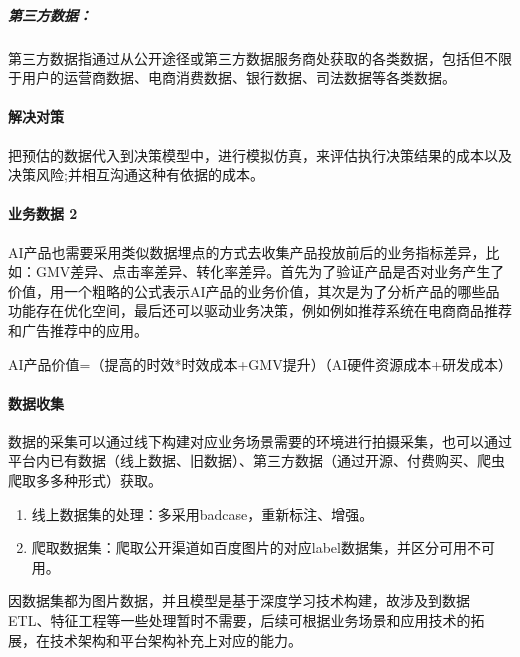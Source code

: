 \documentclass[letterpaper,11pt,english]{sphinxmanual}
\begin{document}
\subparagraph{第三方数据：}
\label{\detokenize{chapter_idea/data:id9}}
第三方数据指通过从公开途径或第三方数据服务商处获取的各类数据，包括但不限于用户的运营商数据、电商消费数据、银行数据、司法数据等各类数据。


\paragraph{解决对策}
\label{\detokenize{chapter_idea/data:id10}}
把预估的数据代入到决策模型中，进行模拟仿真，来评估执行决策结果的成本以及决策风险;并相互沟通这种有依据的成本。


\paragraph{业务数据 2\sphinxfootnotemark[313]}
\label{\detokenize{chapter_idea/data:id11}}%
\begin{footnotetext}[313]\sphinxAtStartFootnote
{}
%
\end{footnotetext}\ignorespaces 
AI产品也需要采用类似数据埋点的方式去收集产品投放前后的业务指标差异，比如：GMV差异、点击率差异、转化率差异。首先为了验证产品是否对业务产生了价值，用一个粗略的公式表示AI产品的业务价值，其次是为了分析产品的哪些品功能存在优化空间，最后还可以驱动业务决策，例如例如推荐系统在电商商品推荐和广告推荐中的应用。

AI产品价值=（提高的时效*时效成本+GMV提升）\sphinxhyphen{}（AI硬件资源成本+研发成本）


\paragraph{数据收集}
\label{\detokenize{chapter_idea/data:id12}}
数据的采集可以通过线下构建对应业务场景需要的环境进行拍摄采集，也可以通过平台内已有数据（线上数据、旧数据）、第三方数据（通过开源、付费购买、爬虫爬取多多种形式）获取。
\begin{enumerate}
%
\item {} 
线上数据集的处理：多采用badcase，重新标注、增强。

\item {} 
爬取数据集：爬取公开渠道如百度图片的对应label数据集，并区分可用不可用。

\end{enumerate}

因数据集都为图片数据，并且模型是基于深度学习技术构建，故涉及到数据ETL、特征工程等一些处理暂时不需要，后续可根据业务场景和应用技术的拓展，在技术架构和平台架构补充上对应的能力。
\end{document}
